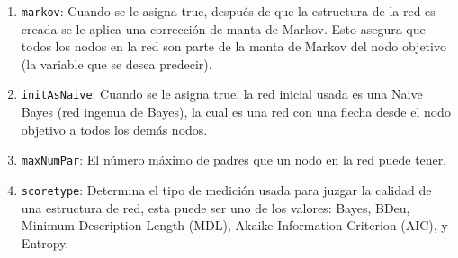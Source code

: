 \begin{enumerate}
	\item \texttt{markov}: Cuando se le asigna true, después de que la estructura de la red es creada se le
		aplica una corrección de manta de Markov. Esto asegura que todos los nodos en la red son parte de la
		manta de Markov del nodo objetivo (la variable que se desea predecir).
	\item \texttt{initAsNaive}: Cuando se le asigna true, la red inicial usada es una Naive Bayes (red ingenua de Bayes), la cual es una red con una flecha desde el nodo objetivo a todos los demás nodos.
	\item \texttt{maxNumPar}: El número máximo de padres que un nodo en la red puede tener.
	\item \texttt{scoretype}: Determina el tipo de medición usada para juzgar la calidad de una estructura de
			red, esta puede ser uno de los valores: Bayes, BDeu, Minimum Description Length (MDL), Akaike 
			Information Criterion (AIC), y Entropy.
\end{enumerate}


